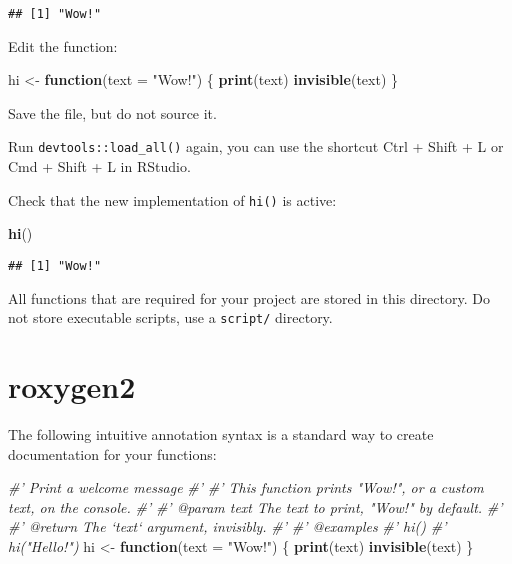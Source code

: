 \documentclass[]{book}
\newenvironment{Shaded}{\begin{snugshade}}{\end{snugshade}}
\newcommand{\CommentTok}[1]{\textcolor[rgb]{0.56,0.35,0.01}{\textit{#1}}}
\newcommand{\ControlFlowTok}[1]{\textcolor[rgb]{0.13,0.29,0.53}{\textbf{#1}}}
\newcommand{\DataTypeTok}[1]{\textcolor[rgb]{0.13,0.29,0.53}{#1}}
\newcommand{\KeywordTok}[1]{\textcolor[rgb]{0.13,0.29,0.53}{\textbf{#1}}}
\newcommand{\NormalTok}[1]{#1}
\newcommand{\StringTok}[1]{\textcolor[rgb]{0.31,0.60,0.02}{#1}}
\begin{document}
\begin{verbatim}
## [1] "Wow!"
\end{verbatim}

Edit the function:

\begin{Shaded}
\begin{Highlighting}[]
\NormalTok{hi <-}\StringTok{ }\ControlFlowTok{function}\NormalTok{(}\DataTypeTok{text =} \StringTok{"Wow!"}\NormalTok{) \{}
  \KeywordTok{print}\NormalTok{(text)}
  \KeywordTok{invisible}\NormalTok{(text)}
\NormalTok{\}}
\end{Highlighting}
\end{Shaded}

Save the file, but do not source it.

Run \texttt{devtools::load\_all()} again, you can use the shortcut Ctrl + Shift + L or Cmd + Shift + L in RStudio.

Check that the new implementation of \texttt{hi()} is active:

\begin{Shaded}
\begin{Highlighting}[]
\KeywordTok{hi}\NormalTok{()}
\end{Highlighting}
\end{Shaded}

\begin{verbatim}
## [1] "Wow!"
\end{verbatim}

All functions that are required for your project are stored in this directory.
Do not store executable scripts, use a \texttt{script/} directory.

\hypertarget{roxygen2}{%
\section{roxygen2}\label{roxygen2}}

The following intuitive annotation syntax is a standard way to create documentation for your functions:

\begin{Shaded}
\begin{Highlighting}[]
\CommentTok{#' Print a welcome message}
\CommentTok{#' }
\CommentTok{#' This function prints "Wow!", or a custom text, on the console.}
\CommentTok{#'}
\CommentTok{#' @param text The text to print, "Wow!" by default.}
\CommentTok{#' }
\CommentTok{#' @return The `text` argument, invisibly.}
\CommentTok{#' }
\CommentTok{#' @examples}
\CommentTok{#' hi()}
\CommentTok{#' hi("Hello!")}
\NormalTok{hi <-}\StringTok{ }\ControlFlowTok{function}\NormalTok{(}\DataTypeTok{text =} \StringTok{"Wow!"}\NormalTok{) \{}
  \KeywordTok{print}\NormalTok{(text)}
  \KeywordTok{invisible}\NormalTok{(text)}
\NormalTok{\}}
\end{Highlighting}
\end{Shaded}
\end{document}
